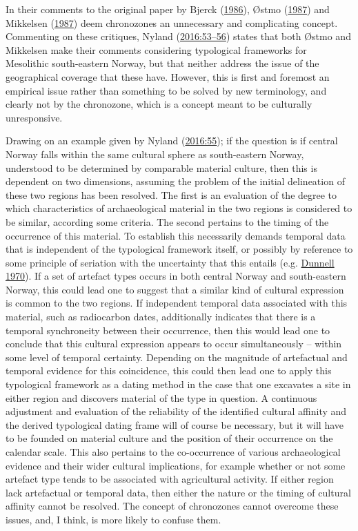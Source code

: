 \documentclass[
  12pt,
  a4paper,
  oneside]{book}
\begin{document}
In their comments to the original paper by Bjerck (\protect\hyperlink{ref-bjerck1986}{1986}), Østmo (\protect\hyperlink{ref-uxf8stmo1987}{1987}) and Mikkelsen (\protect\hyperlink{ref-mikkelsen1987}{1987}) deem chronozones an unnecessary and complicating concept. Commenting on these critiques, Nyland (\protect\hyperlink{ref-nyland2016}{2016:53--56}) states that both Østmo and Mikkelsen make their comments considering typological frameworks for Mesolithic south-eastern Norway, but that neither address the issue of the geographical coverage that these have. However, this is first and foremost an empirical issue rather than something to be solved by new terminology, and clearly not by the chronozone, which is a concept meant to be culturally unresponsive.

Drawing on an example given by Nyland (\protect\hyperlink{ref-nyland2016}{2016:55}); if the question is if central Norway falls within the same cultural sphere as south-eastern Norway, understood to be determined by comparable material culture, then this is dependent on two dimensions, assuming the problem of the initial delineation of these two regions has been resolved. The first is an evaluation of the degree to which characteristics of archaeological material in the two regions is considered to be similar, according some criteria. The second pertains to the timing of the occurrence of this material. To establish this necessarily demands temporal data that is independent of the typological framework itself, or possibly by reference to some principle of seriation with the uncertainty that this entails (e.g. \protect\hyperlink{ref-dunnell1970}{Dunnell 1970}). If a set of artefact types occurs in both central Norway and south-eastern Norway, this could lead one to suggest that a similar kind of cultural expression is common to the two regions. If independent temporal data associated with this material, such as radiocarbon dates, additionally indicates that there is a temporal synchroneity between their occurrence, then this would lead one to conclude that this cultural expression appears to occur simultaneously -- within some level of temporal certainty. Depending on the magnitude of artefactual and temporal evidence for this coincidence, this could then lead one to apply this typological framework as a dating method in the case that one excavates a site in either region and discovers material of the type in question. A continuous adjustment and evaluation of the reliability of the identified cultural affinity and the derived typological dating frame will of course be necessary, but it will have to be founded on material culture and the position of their occurrence on the calendar scale. This also pertains to the co-occurrence of various archaeological evidence and their wider cultural implications, for example whether or not some artefact type tends to be associated with agricultural activity. If either region lack artefactual or temporal data, then either the nature or the timing of cultural affinity cannot be resolved. The concept of chronozones cannot overcome these issues, and, I think, is more likely to confuse them.
\end{document}

